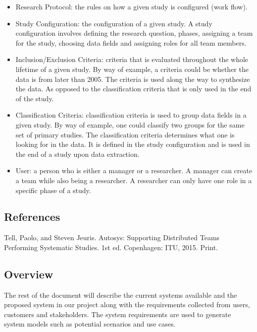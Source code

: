 \begin{itemize}
	  \item Research Protocol: the rules on how a given study is configured (work flow).
	  \item Study Configuration: the configuration of a given study. A study configuration involves defining the research question, phases, assigning a team for the study, choosing data fields and assigning roles for all team members. 
	  \item Inclusion/Exclusion Criteria: criteria that is evaluated throughout the whole lifetime of a given study. By way of example, a criteria could be whether the data is from later than 2005. The criteria is used along the way to synthesize the data. As opposed to the classification criteria that is only used in the end of the study. 
	  \item Classification Criteria: classification criteria is used to group data fields in a given study. By way of example, one could classify two groups for the same set of primary studies. The classification criteria determines what one is looking for in the data. It is defined in the study configuration and is used in the end of a study upon data extraction. 
	  \item User: a person who is either a manager or a researcher. A manager can create a team while also being a researcher. A researcher can only have one role in a specific phase of a study. 
	\end{itemize}
	
\subsection{References}
Tell, Paolo, and Steven Jeuris. Autosys: Supporting Distributed Teams Performing Systematic Studies. 1st ed. Copenhagen: ITU, 2015. Print.

\subsection{Overview}
The rest of the document will describe the current systems available and the proposed system in our project along with the requirements collected from users, customers and stakeholders. The system requirements are used to generate system models such as potential scenarios and use cases. 
